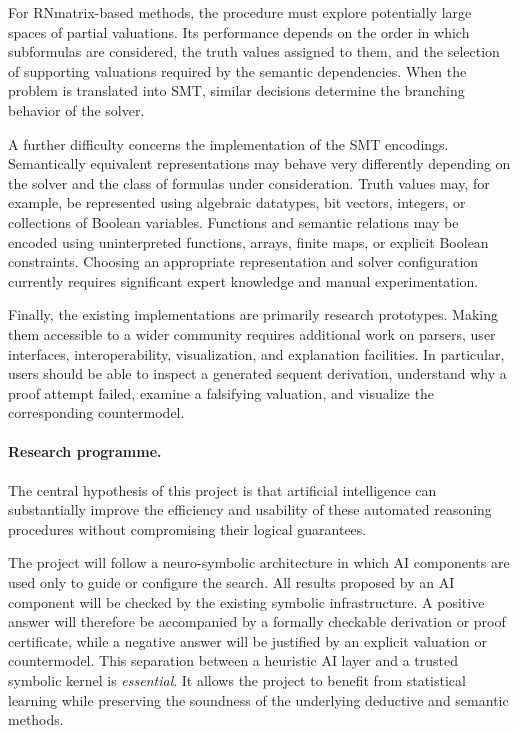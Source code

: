 \documentclass[a4paper]{article}
\begin{document}
For RNmatrix-based methods, the procedure must explore potentially large spaces of partial valuations. Its performance depends on the order in which subformulas are considered, the truth values assigned to them, and the selection of supporting valuations required by the semantic dependencies. When the problem is translated into SMT, similar decisions determine the branching behavior of the solver.

A further difficulty concerns the implementation of the SMT encodings. Semantically equivalent representations may behave very differently depending on the solver and the class of formulas under consideration. Truth values may, for example, be represented using algebraic datatypes, bit vectors, integers, or collections of Boolean variables. Functions and semantic relations may be encoded using uninterpreted functions, arrays, finite maps, or explicit Boolean constraints. Choosing an appropriate representation and solver configuration currently requires significant expert knowledge and manual experimentation.

Finally, the existing implementations are primarily research prototypes. Making them accessible to a wider community requires additional work on parsers, user interfaces, interoperability, visualization, and explanation facilities. In particular, users should be able to inspect a generated sequent derivation, understand why a proof attempt failed, examine a falsifying valuation, and visualize the corresponding countermodel.

\paragraph{Research programme.}
The central hypothesis of this project is that artificial intelligence can substantially improve the efficiency and usability of these automated reasoning procedures without compromising their logical guarantees.

The project will follow a neuro-symbolic architecture in which AI components are used only to guide or configure the search. All results proposed by an AI component will be checked by the existing symbolic infrastructure. A positive answer will therefore be accompanied by a formally checkable derivation or proof certificate, while a negative answer will be justified by an explicit valuation or countermodel.
%
This separation between a heuristic AI layer and a trusted symbolic kernel is {\em essential}. It allows the project to benefit from statistical learning while preserving the soundness of the underlying deductive and semantic methods.
\end{document}
